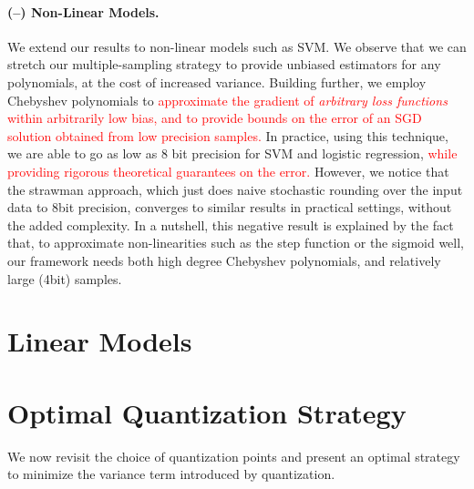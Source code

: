 \documentclass{article}
\begin{document}
\paragraph{(--) Non-Linear Models.} We extend our
results to non-linear models such as SVM. We observe that 
we can stretch our multiple-sampling strategy to provide 
unbiased estimators for any polynomials, at the cost of increased variance. 
Building further, we employ Chebyshev polynomials to   
\textcolor{red}{
approximate the gradient of \emph{arbitrary loss functions} within arbitrarily low bias, 
and to provide bounds on the error of an SGD solution obtained from low precision samples. }
%
%
In practice, using this technique, we are
able to go as low as 8 bit precision for SVM and logistic regression, \textcolor{red}{while providing 
rigorous theoretical guarantees on the error.} However, we notice that the strawman approach, which just
does naive stochastic rounding over the input data to 8bit precision, converges to similar results in practical settings, 
without the added complexity. 
In a nutshell, this negative result is explained by the fact that, to approximate non-linearities such as the step function or the sigmoid well, our framework needs both high degree Chebyshev polynomials, and relatively large (4bit) samples. 



\vspace{-0.5em}
\section{Linear Models}


%






\vspace{-2em}
\section{Optimal Quantization Strategy} \label{sec:optimal}

\vspace{-0.5em}
We now revisit the choice of quantization points
and present an optimal strategy to minimize 
the variance term introduced by quantization.
\end{document}

